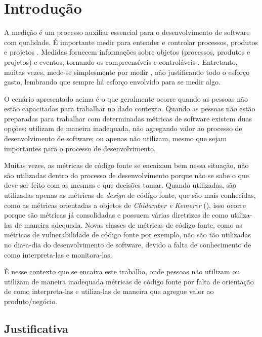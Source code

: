 \chapter{Introdução} \label{cap:introducao}

A medição é um processo auxiliar essencial para o desenvolvimento de software
com qualidade. É importante medir para entender e controlar processos, produtos 
e projetos \cite{ministerio_processo2012}. Medidas fornecem informações sobre 
objetos (processos, produtos e projetos) e eventos, tornando-os compreensíveis 
e controláveis \cite{fenton&pfleenger98}. Entretanto, muitas vezes, mede-se
simplesmente por medir \cite{ministerio_processo2012}, não justificando todo o 
esforço gasto, lembrando que sempre há esforço envolvido para se medir algo.

O cenário apresentado acima é o que geralmente ocorre quando as pessoas não estão
capacitadas para trabalhar no dado contexto. Quando as pessoas não estão
preparadas para trabalhar com determinadas métricas de software existem duas opções:
utilizam de maneira inadequada, não agregando valor ao processo de desenvolvimento
de software; ou apenas não utilizam, mesmo que sejam importantes para o processo de
desenvolvimento.

Muitas vezes, as métricas de código fonte se encaixam bem nessa situação, não são 
utilizadas dentro do processo de desenvolvimento porque não se sabe o que deve ser
feito com as mesmas e que decisões tomar. Quando utilizadas, são utilizadas apenas
as métricas de \textit{design} de código fonte, que são mais conhecidas, como as 
métricas orientadas a objetos de \emph{Chidamber e Kemerer} 
(\citeyear{chidamber&kemerer2002}), isso ocorre porque são métricas já consolidadas
e possuem várias diretrizes de como utiliza-las de maneira adequada. Novas classes 
de métricas de código fonte, como as métricas de vulnerabilidade de código fonte 
por exemplo, não são tão utilizadas no dia-a-dia do desenvolvimento de software, 
devido a falta de conhecimento de como interpreta-las e monitora-las.

É nesse contexto que se encaixa este trabalho, onde pessoas não utilizam ou utilizam
de maneira inadequada métricas de código fonte por falta de orientação de como 
interpreta-las e utiliza-las de maneira que agregue valor ao produto/negócio.

\section{Justificativa}


